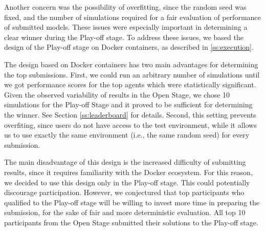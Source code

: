 \documentclass[graybox]{svmult}
\begin{document}
Another concern was the possibility of overfitting, since the random seed was fixed, and the number of simulations required for a fair evaluation of performance of submitted models. These issues were especially important in determining a clear winner during the Play-off stage. To address these issues, we based the design of the Play-off stage on Docker containers, as described in \ref{ss:execution}.

The design based on Docker containers has two main advantages for determining the top submissions. First, we could run an arbitrary number of simulations until we got performance scores for the top agents which were statistically significant. Given the observed variability of results in the Open Stage, we chose 10 simulations for the Play-off Stage and it proved to be sufficient for determining the winner. See Section \ref{ss:leaderboard} for details. Second, this setting prevents overfiting, since users do not have access to the test environment, while it allows us to use exactly the same environment (i.e., the same random seed) for every submission.

The main disadvantage of this design is the increased difficulty of submitting results, since it requires familiarity with the Docker ecosystem. For this reason, we decided to use this design only in the Play-off stage. This could potentially discourage participation. However, we conjectured that top participants who qualified to the Play-off stage will be willing to invest more time in preparing the submission, for the sake of fair and more deterministic evaluation. All top 10 participants from the Open Stage submitted their solutions to the Play-off stage.

\end{document}
